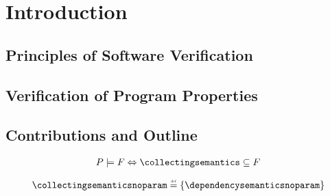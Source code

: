 \chapter{Introduction}

\section{Principles of Software Verification}

\section{Verification of Program Properties}

\section{Contributions and Outline}


\begin{definition}[Validation]
  \begin{align}
    \labeq{validation}
    \defprogram \satisfies \defproperty \iff \collectingsemantics \subseteq \defproperty
  \end{align}
\end{definition}

\begin{definition}
  \begin{align}
    \labeq{collecting-semantics}
    \collectingsemanticsnoparam \defeq \{ \dependencysemanticsnoparam \}
  \end{align}
\end{definition}
